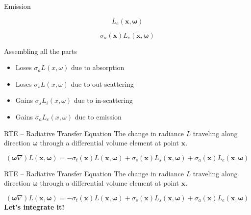 \documentclass[
  english,            %
  aspectratio=169,    %
]{tumbeamer}
\newcommand\bx[0]{\bm{x}}
\newcommand\bomega[0]{\bm{\omega}}
\begin{document}
\begin{frame}{Emission}
\begin{figure}[ht]
    \centering
        
\end{figure}
$$L_e(\bx, \bomega)$$

$$\sigma_a(\boldsymbol{x})L_e(\bx, \bomega)$$
\end{frame}

\begin{frame}{Assembling all the parts}
    \begin{figure}[ht]
        \centering
        
        \label{fig:interactions}
    \end{figure}
    \begin{itemize}
        \item Loses $\sigma_a L(x, \omega)$ due to absorption
        \item Loses $\sigma_s L(x, \omega)$ due to out-scattering
        \item Gains $\sigma_s L_i(x, \omega)$ due to in-scattering
        \item Gains $\sigma_a L_e(x, \omega)$ due to emission
    \end{itemize}
\end{frame}


\begin{frame}{RTE -- Radiative Transfer Equation}
    The change in radiance $L$ traveling along direction $\boldsymbol{\omega}$
    through a differential volume element at point $\boldsymbol{x}$.
    \begin{figure}[ht]
        \centering
        \scalebox{.7}{
            
        }
    \end{figure}
    \begin{equation} 
        \label{eq:RTE}
        (\bomega \nabla)L(\bx,\bomega) =
        - \sigma_t(\bx)L(\bx,\bomega)
        + \sigma_s(\bx)L_s(\bx,\bomega) + \sigma_a(\bx)L_e(\bx,\bomega)
    \end{equation}
\end{frame}

\begin{frame}{RTE -- Radiative Transfer Equation}
    The change in radiance $L$ traveling along direction $\boldsymbol{\omega}$
    through a differential volume element at point $\boldsymbol{x}$.
    \begin{figure}[ht]
        \centering
        \scalebox{.7}{
            
        }
    \end{figure}
    \begin{equation} 
        \label{eq:RTE}
        (\bomega \nabla)L(\bx,\bomega) =
        - \sigma_t(\bx)L(\bx,\bomega)
        + \sigma_s(\bx)L_s(\bx,\bomega) + \sigma_a(\bx)L_e(\bx,\bomega)
    \end{equation}
    \centering
    \vfill
    \textbf{Let's integrate it!}
\end{frame}
\end{document}
